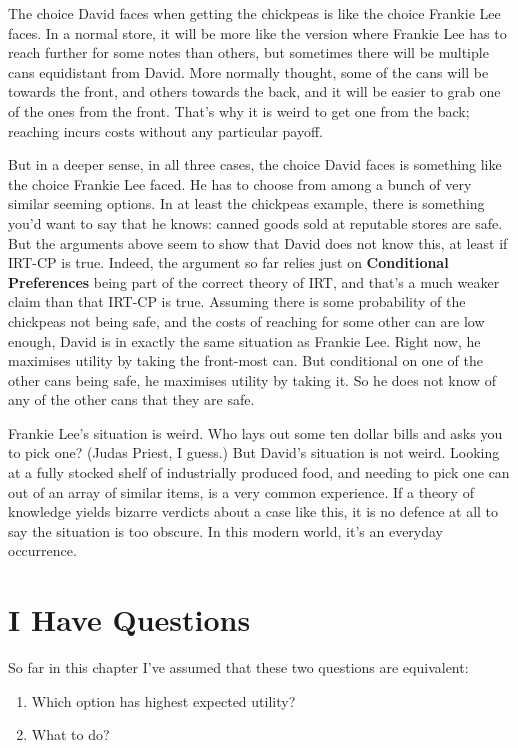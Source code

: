 \documentclass[11pt,]{book}
\providecommand{\tightlist}{%
  \setlength{\itemsep}{0pt}\setlength{\parskip}{0pt}}
\begin{document}
The choice David faces when getting the chickpeas is like the choice Frankie Lee faces. In a normal store, it will be more like the version where Frankie Lee has to reach further for some notes than others, but sometimes there will be multiple cans equidistant from David. More normally thought, some of the cans will be towards the front, and others towards the back, and it will be easier to grab one of the ones from the front. That's why it is weird to get one from the back; reaching incurs costs without any particular payoff.

But in a deeper sense, in all three cases, the choice David faces is something like the choice Frankie Lee faced. He has to choose from among a bunch of very similar seeming options. In at least the chickpeas example, there is something you'd want to say that he knows: canned goods sold at reputable stores are safe. But the arguments above seem to show that David does not know this, at least if IRT-CP is true. Indeed, the argument so far relies just on \textbf{Conditional Preferences} being part of the correct theory of IRT, and that's a much weaker claim than that IRT-CP is true. Assuming there is some probability of the chickpeas not being safe, and the costs of reaching for some other can are low enough, David is in exactly the same situation as Frankie Lee. Right now, he maximises utility by taking the front-most can. But conditional on one of the other cans being safe, he maximises utility by taking it. So he does not know of any of the other cans that they are safe.

Frankie Lee's situation is weird. Who lays out some ten dollar bills and asks you to pick one? (Judas Priest, I guess.) But David's situation is not weird. Looking at a fully stocked shelf of industrially produced food, and needing to pick one can out of an array of similar items, is a very common experience. If a theory of knowledge yields bizarre verdicts about a case like this, it is no defence at all to say the situation is too obscure. In this modern world, it's an everyday occurrence.

\hypertarget{supermarketquestions}{%
\section{I Have Questions}\label{supermarketquestions}}

So far in this chapter I've assumed that these two questions are equivalent:

\begin{enumerate}
\def\labelenumi{\arabic{enumi}.}
\tightlist
\item
  Which option has highest expected utility?
\item
  What to do?
\end{enumerate}
\end{document}
